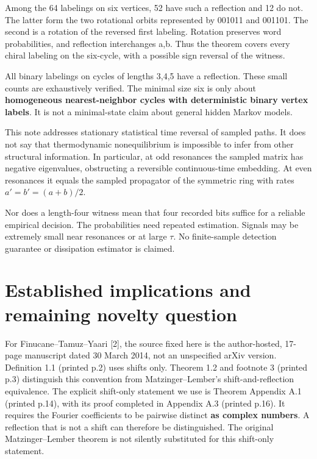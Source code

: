 \documentclass[11pt,a4paper]{article}
\begin{document}
Among the 64 labelings on six vertices, 52 have such a reflection and 12
do not. The latter form the two rotational orbits represented by 001011
and 001101. The second is a rotation of the reversed first labeling.
Rotation preserves word probabilities, and reflection interchanges a,b.
Thus the theorem covers every chiral labeling on the six-cycle, with a
possible sign reversal of the witness.

All binary labelings on cycles of lengths 3,4,5 have a reflection. These
small counts are exhaustively verified. The minimal size six is only
about \textbf{homogeneous nearest-neighbor cycles with deterministic
binary vertex labels}. It is not a minimal-state claim about general
hidden Markov models.

This note addresses stationary statistical time reversal of sampled
paths. It does not say that thermodynamic nonequilibrium is impossible
to infer from other structural information. In particular, at odd
resonances the sampled matrix has negative eigenvalues, obstructing a
reversible continuous-time embedding. At even resonances it equals the
sampled propagator of the symmetric ring with rates \(a'=b'=(a+b)/2\).

Nor does a length-four witness mean that four recorded bits suffice for
a reliable empirical decision. The probabilities need repeated
estimation. Signals may be extremely small near resonances or at large
\(\tau\). No finite-sample detection guarantee or dissipation estimator
is claimed.

\hypertarget{established-implications-and-remaining-novelty-question}{%
\section{Established implications and remaining novelty
question}\label{established-implications-and-remaining-novelty-question}}

For Finucane--Tamuz--Yaari {[}2{]}, the source fixed here is the
author-hosted, 17-page manuscript dated 30 March 2014, not an
unspecified arXiv version. Definition 1.1 (printed p.2) uses shifts
only. Theorem 1.2 and footnote 3 (printed p.3) distinguish this
convention from Matzinger--Lember's shift-and-reflection equivalence.
The explicit shift-only statement we use is Theorem Appendix A.1
(printed p.14), with its proof completed in Appendix A.3 (printed p.16).
It requires the Fourier coefficients to be pairwise distinct \textbf{as
complex numbers}. A reflection that is not a shift can therefore be
distinguished. The original Matzinger--Lember theorem is not silently
substituted for this shift-only statement.
\end{document}
